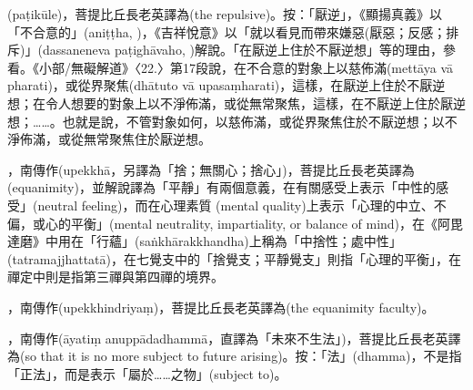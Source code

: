 \startitemgroup[noteitems]
\item{}(paṭikūle)，菩提比丘長老英譯為(the repulsive)。按：「厭逆」，《顯揚真義》以「不合意的」(aniṭṭha, )，《吉祥悅意》以「就以看見而帶來嫌惡(厭惡；反感；排斥)」(dassaneneva paṭighāvaho, )解說。「在厭逆上住於不厭逆想」等的理由，參看。《小部/無礙解道》〈22.〉第17段說，在不合意的對象上以慈佈滿(mettāya vā pharati)，或從界聚焦(dhātuto vā upasaṃharati)，這樣，在厭逆上住於不厭逆想；在令人想要的對象上以不淨佈滿，或從無常聚焦，這樣，在不厭逆上住於厭逆想；……。也就是說，不管對象如何，以慈佈滿，或從界聚焦住於不厭逆想；以不淨佈滿，或從無常聚焦住於厭逆想。
\stopitemgroup

\startitemgroup[noteitems]
\item{}，南傳作(upekkhā，另譯為「捨；無關心；捨心」)，菩提比丘長老英譯為(equanimity)，並解說譯為「平靜」有兩個意義，在有關感受上表示「中性的感受」(neutral feeling)，而在心理素質 (mental quality)上表示「心理的中立、不偏，或心的平衡」(mental neutrality, impartiality, or balance of mind)，在《阿毘達磨》中用在「行蘊」(saṅkhārakkhandha)上稱為「中捨性；處中性」(tatramajjhattatā)，在七覺支中的「捨覺支；平靜覺支」則指「心理的平衡」，在禪定中則是指第三禪與第四禪的境界。
\item{}，南傳作(upekkhindriyaṃ)，菩提比丘長老英譯為(the equanimity faculty)。
\stopitemgroup

\startitemgroup[noteitems]
\item{}，南傳作(āyatiṃ anuppādadhammā，直譯為「未來不生法」)，菩提比丘長老英譯為(so that it is no more subject to future arising)。按：「法」(dhamma)，不是指「正法」，而是表示「屬於……之物」(subject to)。
\stopitemgroup

